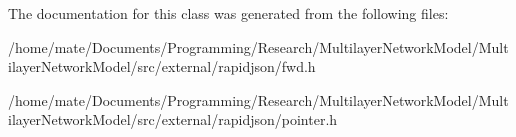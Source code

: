 The documentation for this class was generated from the following files\+:\begin{DoxyCompactItemize}
\item 
/home/mate/\+Documents/\+Programming/\+Research/\+Multilayer\+Network\+Model/\+Multilayer\+Network\+Model/src/external/rapidjson/fwd.\+h\item 
/home/mate/\+Documents/\+Programming/\+Research/\+Multilayer\+Network\+Model/\+Multilayer\+Network\+Model/src/external/rapidjson/pointer.\+h\end{DoxyCompactItemize}
